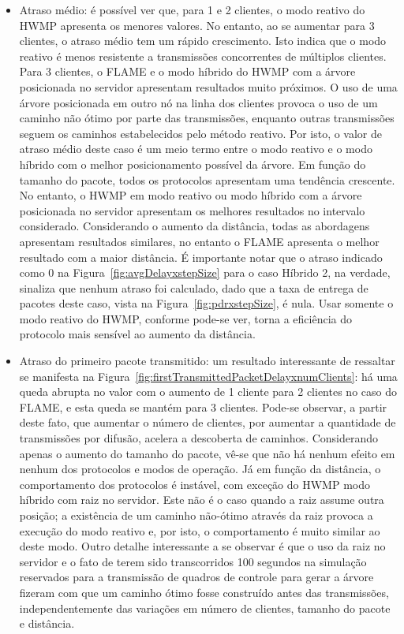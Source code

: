 \documentclass[letterpaper, 10 pt, conference]{ieeeconf}  %
\begin{document}
\begin{itemize}
    \item Atraso médio: é possível ver que, para 1 e 2 clientes, o modo reativo do HWMP apresenta os menores valores. No entanto, ao se aumentar para 3 clientes, o atraso médio tem um rápido crescimento. Isto indica que o modo reativo é menos resistente a transmissões concorrentes de múltiplos clientes. Para 3 clientes, o FLAME e o modo híbrido do HWMP com a árvore posicionada no servidor apresentam resultados muito próximos. O uso de uma árvore posicionada em outro nó na linha dos clientes provoca o uso de um caminho não ótimo por parte das transmissões, enquanto outras transmissões seguem os caminhos estabelecidos pelo método reativo. Por isto, o valor de atraso médio deste caso é um meio termo entre o modo reativo e o modo híbrido com o melhor posicionamento possível da árvore. Em função do tamanho do pacote, todos os protocolos apresentam uma tendência crescente. No entanto, o HWMP em modo reativo ou modo híbrido com a árvore posicionada no servidor apresentam os melhores resultados no intervalo considerado. Considerando o aumento da distância, todas as abordagens apresentam resultados similares, no entanto o FLAME apresenta o melhor resultado com a maior distância. É importante notar que o atraso indicado como 0 na Figura~\ref{fig:avgDelayxstepSize} para o caso Híbrido 2, na verdade, sinaliza que nenhum atraso foi calculado, dado que a taxa de entrega de pacotes deste caso, vista na Figura~\ref{fig:pdrxstepSize}, é nula. Usar somente o modo reativo do HWMP, conforme pode-se ver, torna a eficiência do protocolo mais sensível ao aumento da distância.
\\
\item Atraso do primeiro pacote transmitido: um resultado interessante de ressaltar se manifesta na Figura~\ref{fig:firstTransmittedPacketDelayxnumClients}: há uma queda abrupta no valor com o aumento de 1 cliente para 2 clientes no caso do FLAME, e esta queda se mantém para 3 clientes. Pode-se observar, a partir deste fato, que aumentar o número de clientes, por aumentar a quantidade de transmissões por difusão, acelera a descoberta de caminhos. Considerando apenas o aumento do tamanho do pacote, vê-se que não há nenhum efeito em nenhum dos protocolos e modos de operação. Já em função da distância, o comportamento dos protocolos é instável, com exceção do HWMP modo híbrido com raiz no servidor. Este não é o caso quando a raiz assume outra posição; a existência de um caminho não-ótimo através da raiz provoca a execução do modo reativo e, por isto, o comportamento é muito similar ao deste modo. Outro detalhe interessante a se observar é que o uso da raiz no servidor e o fato de terem sido transcorridos 100 segundos na simulação reservados para a transmissão de quadros de controle para gerar a árvore fizeram com que um caminho ótimo  fosse construído antes das transmissões, independentemente das variações em número de clientes, tamanho do pacote e distância.
\end{itemize}
\end{document}

